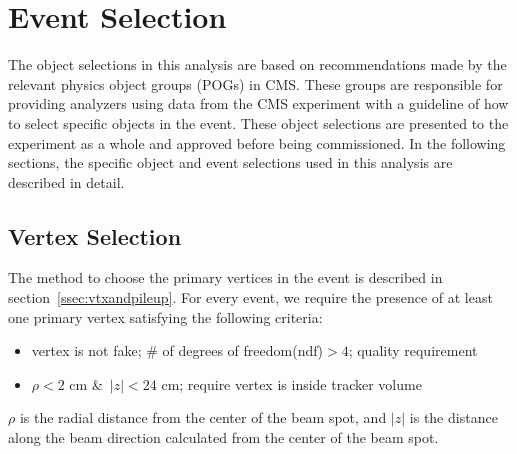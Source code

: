 \clearpage

\section{Event Selection}
The object selections in this analysis are based on recommendations made by the relevant physics object groups (POGs) in CMS.
These groups are responsible for providing analyzers using data from the CMS experiment with a guideline of how to select specific objects in the event.
These object selections are presented to the experiment as a whole and approved before being commissioned.
In the following sections, the specific object and event selections used in this analysis are described in detail.

\subsection{Vertex Selection}
The method to choose the primary vertices in the event is described in section~\ref{ssec:vtxandpileup}.
For every event, we require the presence of at least one primary vertex satisfying the following criteria:

\begin{itemize}
\item vertex is not fake; \# of degrees of freedom($\mathrm{ndf}$)$>4$; quality requirement
\item $\rho<2$ cm \&\ $|z|<24$ cm; require vertex is inside tracker volume
\end{itemize}

$\rho$ is the radial distance from the center of the beam spot,
and $|z|$ is the distance along the beam direction calculated from the center of the beam spot.

